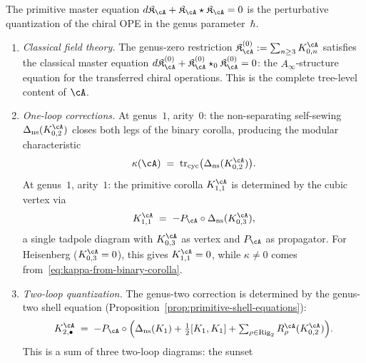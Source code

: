 \begin{theorem}
\label{thm:deformation-quantization-ope}
The primitive master equation
$d\mathfrak{K}_\cA + \mathfrak{K}_\cA \star
\mathfrak{K}_\cA = 0$
is the perturbative quantization of the chiral OPE
in the genus parameter~$\hbar$.
\begin{enumerate}[label=\textup{(\roman*)}]
\item \emph{Classical field theory.}
  The genus-zero restriction
  $\mathfrak{K}_\cA^{(0)} := \sum_{n \geq 3} K_{0,n}^\cA$
  satisfies the classical master equation
  $d\mathfrak{K}_\cA^{(0)}
  + \mathfrak{K}_\cA^{(0)} \star_0
  \mathfrak{K}_\cA^{(0)} = 0$:
  the $A_\infty$-structure equation for the transferred
  chiral operations.  This is the complete tree-level content
  of $\cA$.
\item \emph{One-loop corrections.}
  At genus~$1$, arity~$0$: the non-separating self-sewing
  $\Delta_{\mathrm{ns}}(K_{0,2}^\cA)$ closes both legs of
  the binary corolla, producing the modular characteristic
  \begin{equation}
  \label{eq:kappa-from-binary-corolla}
  \kappa(\cA)
  \;=\;
  \operatorname{tr}_{\mathrm{cyc}}\bigl(
  \Delta_{\mathrm{ns}}(K_{0,2}^\cA)
  \bigr).
  \end{equation}
  At genus~$1$, arity~$1$: the primitive corolla
  $K_{1,1}^\cA$ is determined by the cubic vertex via
  \begin{equation}
  \label{eq:genus-one-feynman}
  K_{1,1}^\cA
  \;=\;
  -P_\cA \circ \Delta_{\mathrm{ns}}(K_{0,3}^\cA),
  \end{equation}
  a single tadpole diagram with $K_{0,3}^\cA$ as vertex
  and $P_\cA$ as propagator.  For Heisenberg
  ($K_{0,3}^\cA = 0$), this gives $K_{1,1}^\cA = 0$,
  while $\kappa \neq 0$ comes
  from~\eqref{eq:kappa-from-binary-corolla}.
\item \emph{Two-loop quantization.}
  The genus-two correction is determined by the genus-two
  shell equation
  \textup{(}Proposition~\textup{\ref{prop:primitive-shell-equations})}:
  \begin{equation}
  \label{eq:genus-two-feynman}
  K_{2,\bullet}^\cA
  \;=\;
  -P_\cA \circ \Bigl(
  \Delta_{\mathrm{ns}}(K_1)
  + \tfrac{1}{2}[K_1, K_1]
  + \textstyle\sum_{\rho \in \operatorname{Rig}_2}
  R_\rho^\cA(K_{0,2}^\cA)
  \Bigr).
  \end{equation}
  This is a sum of three two-loop diagrams: the sunset

\end{enumerate}
\end{theorem}
